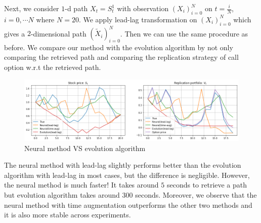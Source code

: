 \documentclass[12pt]{report}
\theoremstyle{definition}
\theoremstyle{remark}
\begin{document}
Next, we consider $1$-d path $X_{t} = S^{1}_{t}$ with observation $(X_{i})_{i=0}^{N}$ on $t = \frac{i}{N}$, $i = 0,\cdots N$ where $N = 20$. We apply lead-lag transformation on $(X_{i})_{i=0}^{N}$ which gives a $2$-dimensional path $(\tilde{X}_{i})_{i=0}^{N}$. Then we can use the same procedure as before. We compare our method with the evolution algorithm by not only comparing the retrieved path and comparing the replication strategy of call option w.r.t the retrieved path. 
\begin{figure}[H]
  \centering
  \includegraphics[width=\textwidth]{figs/inverse9.png}
  \caption{Neural method VS evolution algorithm}
\end{figure}
The neural method with lead-lag slightly performs better than the evolution algorithm with lead-lag in most cases, but the difference is negligible. However, the neural method is much faster! It takes around $5$ seconds to retrieve a path but evolution algorithm takes around $300$ seconds. Moreover, we observe that the neural method with time augmentation outperforms the other two methods and it is also more stable across experiments.   
\end{document}
